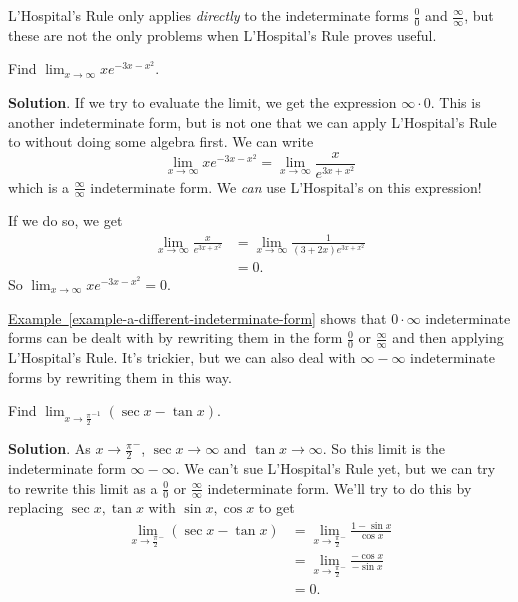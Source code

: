 \documentclass[10pt,]{book}
\theoremstyle{ptxplainnotitle}
\theoremstyle{ptxplaintitle}
\theoremstyle{ptxplainnotitle}
\theoremstyle{ptxplaintitle}
\theoremstyle{ptxplainnotitle}
\theoremstyle{ptxplaintitle}
\theoremstyle{ptxdefinitionnotitle}
\theoremstyle{ptxdefinitiontitle}
\theoremstyle{ptxdefinitionnotitle}
\theoremstyle{ptxdefinitiontitle}
\theoremstyle{ptxdefinitionnotitle}
\theoremstyle{ptxdefinitiontitle}
\theoremstyle{ptxdefinitionnotitle}
\theoremstyle{ptxdefinitiontitle}
\theoremstyle{ptxdefinitionnotitle}
\theoremstyle{ptxdefinitiontitle}
\numberwithin{equation}{section}
\begin{document}
\hypertarget{p-296}{}%
L'Hospital's Rule only applies \emph{directly} to the indeterminate forms \(\frac{0}{0}\) and \(\frac{\infty}{\infty}\), but these are not the only problems when L'Hospital's Rule proves useful.%
\begin{example}\label{example-a-different-indeterminate-form}
\hypertarget{p-297}{}%
Find \(\lim_{x\to\infty}xe^{-3x - x^{2}}\).%
\par\smallskip%
\noindent\textbf{Solution}.\hypertarget{solution-66}{}\quad%
\hypertarget{p-298}{}%
If we try to evaluate the limit, we get the expression \(\infty\cdot0\). This is another indeterminate form, but is not one that we can apply L'Hospital's Rule to without doing some algebra first. We can write%
\begin{equation*}
\lim_{x\to\infty}xe^{-3x-x^{2}} = \lim_{x\to\infty}\frac{x}{e^{3x+x^{2}}}
\end{equation*}
which is a \(\frac{\infty}{\infty}\) indeterminate form. We \emph{can} use L'Hospital's on this expression!%
\par
\hypertarget{p-299}{}%
If we do so, we get%
\begin{align*}
\lim_{x\to\infty}\frac{x}{e^{3x+x^{2}}} & = \lim_{x\to\infty}\frac{1}{(3+2x)e^{3x+x^{2}}} \\
& = 0. 
\end{align*}
So \(\lim_{x\to\infty}xe^{-3x-x^{2}} = 0\).%
\end{example}
\hypertarget{p-300}{}%
\hyperref[example-a-different-indeterminate-form]{Example~\ref{example-a-different-indeterminate-form}} shows that \(0\cdot\infty\) indeterminate forms can be dealt with by rewriting them in the form \(\frac{0}{0}\) or \(\frac{\infty}{\infty}\) and then applying L'Hospital's Rule. It's trickier, but we can also deal with \(\infty-\infty\) indeterminate forms by rewriting them in this way.%
\begin{example}\label{example---infty-infty--indeterminate-form}
\hypertarget{p-301}{}%
Find \(\lim_{x\to\frac{\pi}{2}^{-1}}(\sec x-\tan x)\).%
\par\smallskip%
\noindent\textbf{Solution}.\hypertarget{solution-67}{}\quad%
\hypertarget{p-302}{}%
As \(x\to\frac{\pi}{2}^{-}\), \(\sec x\to\infty\) and \(\tan x\to\infty\). So this limit is the indeterminate form \(\infty-\infty\). We can't sue L'Hospital's Rule yet, but we can try to rewrite this limit as a \(\frac{0}{0}\) or \(\frac{\infty}{\infty}\) indeterminate form. We'll try to do this by replacing \(\sec x,\tan x\) with \(\sin x,\cos x\) to get%
\begin{align*}
\lim_{x\to\frac{\pi}{2}^{-}}(\sec x - \tan x) & =\lim_{x\to\frac{\pi}{2}^{-}}\frac{1-\sin x}{\cos x} \\
& = \lim_{x\to\frac{\pi}{2}^{-}}\frac{-\cos x}{-\sin x} \\
& = 0. 
\end{align*}
%
\end{example}
\end{document}
